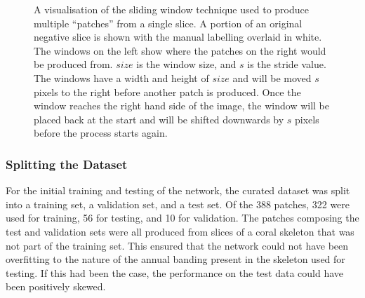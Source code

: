 \begin{figure}[t]
    \centering
    \caption{A visualisation of the sliding window technique used to produce multiple ``patches'' from a single slice. A portion of an original negative slice is shown with the manual labelling overlaid in white. The windows on the left show where the patches on the right would be produced from. $size$ is the window size, and $s$ is the stride value. The windows have a width and height of $size$ and will be moved $s$ pixels to the right before another patch is produced. Once the window reaches the right hand side of the image, the window will be placed back at the start and will be shifted downwards by $s$ pixels before the process starts again.}
    \label{fig:slidingwindow}
\end{figure}

\subsubsection{Splitting the Dataset}

For the initial training and testing of the network, the curated dataset was split into a training set, a validation set, and a test set. Of the 388 patches, 322 were used for training, 56 for testing, and 10 for validation. The patches composing the test and validation sets were all produced from slices of a coral skeleton that was not part of the training set. This ensured that the network could not have been overfitting to the nature of the annual banding present in the skeleton used for testing. If this had been the case, the performance on the test data could have been positively skewed.


